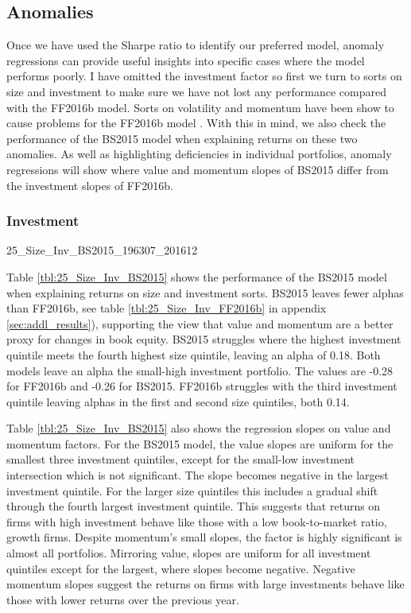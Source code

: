 
\subsection{Anomalies}

Once we have used the Sharpe ratio to identify our preferred model, anomaly regressions
can provide useful insights into specific cases where the model performs poorly. I have
omitted the investment factor so first we turn to sorts on size and investment to make
sure we have not lost any performance compared with the FF2016b model. Sorts on volatility
\parencite{ang2006cross} and momentum \parencite{jegadeesh1993returns} have been show to
cause problems for the FF2016b model \parencite{fama2016dissecting}. With this in mind, we
also check the performance of the BS2015 model when explaining returns on these two
anomalies. As well as highlighting deficiencies in individual portfolios, anomaly
regressions will show where value and momentum slopes of BS2015 differ from the investment
slopes of FF2016b.

\subsubsection{Investment}

{25_Size_Inv_BS2015_196307_201612}

Table \ref{tbl:25_Size_Inv_BS2015} shows the performance of the BS2015
model when  explaining returns on size and investment sorts. BS2015 leaves fewer alphas
than FF2016b, see table \ref{tbl:25_Size_Inv_FF2016b} in appendix \ref{sec:addl_results}),
supporting the view that value and momentum are a better proxy for changes in book equity.
BS2015 struggles where the highest investment quintile meets the fourth highest size
quintile, leaving an alpha of 0.18. Both models leave an alpha the small-high investment
portfolio. The values are -0.28 for FF2016b and -0.26 for BS2015. FF2016b struggles with
the third investment quintile leaving alphas in the first and second  size quintiles, both
0.14.

Table \ref{tbl:25_Size_Inv_BS2015} also shows the regression slopes on value and momentum
factors. For the BS2015 model, the value slopes are uniform for the smallest three
investment  quintiles, except for the small-low investment intersection which is not
significant. The slope becomes negative in the largest investment quintile. For the larger
size quintiles this includes a gradual shift through the fourth largest investment
quintile. This suggests that returns on firms with high investment behave like those with
a low  book-to-market ratio, growth firms. Despite momentum's small slopes, the factor is
highly significant is almost all portfolios. Mirroring value, slopes are uniform for all
investment quintiles except for the largest, where  slopes become negative. Negative
momentum slopes suggest the returns on firms with large investments behave like those with
lower returns over the previous year.

